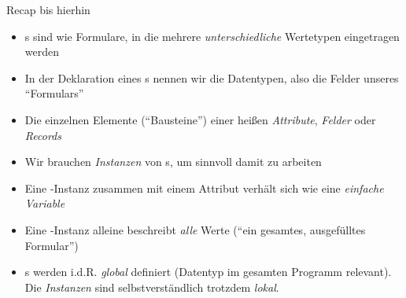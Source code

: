 
\begin{frame}[fragile]{Recap bis hierhin}
%
\begin{itemize}
\item {}s sind wie Formulare, in die mehrere \emph{unterschiedliche} Wertetypen eingetragen werden
\item In der Deklaration eines s nennen wir die Datentypen, also die Felder unseres \enquote{Formulars}
\item Die einzelnen Elemente (\enquote{Bausteine}) einer  heißen \emph{Attribute}, \emph{Felder} oder \emph{Records}
\item Wir brauchen \emph{Instanzen} von s, um sinnvoll damit zu arbeiten
\item Eine -Instanz zusammen mit einem Attribut verhält sich wie eine \emph{einfache Variable}
\item Eine -Instanz alleine beschreibt \emph{alle} Werte (\enquote{ein gesamtes, ausgefülltes Formular})
\item {}s werden i.\;d.\;R. \emph{global} definiert (Datentyp im gesamten Programm relevant). Die \emph{Instanzen} sind selbstverständlich trotzdem \emph{lokal}.
\end{itemize}
%
\end{frame}


